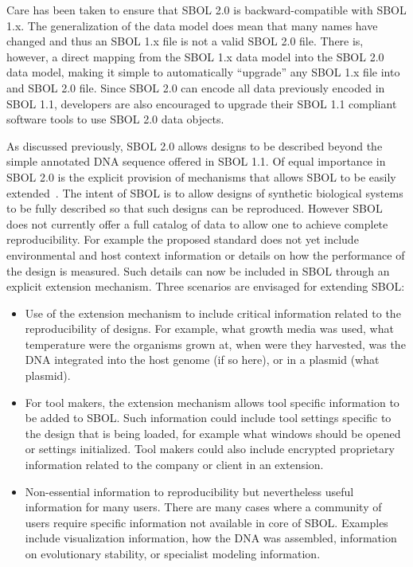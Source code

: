 Care has been taken to ensure that SBOL 2.0 is backward-compatible with SBOL 1.x.  
The generalization of the data model does mean that many names have changed and thus an SBOL 1.x file is not a valid SBOL 2.0 file.
There is, however, a direct mapping from the SBOL 1.x data model into the SBOL 2.0 data model, making it simple to automatically ``upgrade'' any SBOL 1.x file into and SBOL 2.0 file.
Since SBOL 2.0 can encode all data previously encoded in SBOL 1.1, developers are also encouraged to upgrade their SBOL 1.1 compliant software tools to use SBOL 2.0 data objects. 

As discussed previously, SBOL 2.0 allows designs to be described beyond the simple annotated DNA sequence offered in SBOL 1.1. Of equal importance in SBOL 2.0 is the explicit provision of mechanisms that allows SBOL to be easily extended~\cite{sec:Annotation}. The intent of SBOL is to allow designs of synthetic biological systems to be fully described so that such designs can be reproduced. However SBOL does not currently offer a full catalog of data %
to allow one to achieve complete reproducibility. For example the proposed standard does not yet include environmental and host context information or details on how the performance of the design is measured. Such details can now be included in SBOL through an explicit extension mechanism. Three scenarios are envisaged for extending SBOL:

\begin{itemize}
\item Use of the extension mechanism to include critical information related to the reproducibility of designs. For example, what growth media was used, what temperature were the organisms grown at, when were they harvested, was the DNA integrated into the host genome (if so here), or in a plasmid (what plasmid).
\item For tool makers, the extension mechanism allows tool specific information to be added to SBOL. Such information could include tool settings specific to the design that is being loaded, for example what windows should be opened or settings initialized. Tool makers could also include encrypted proprietary information related to the company or client in an extension. 
\item Non-essential information to reproducibility but nevertheless useful information for many users. There are many cases where a community of users require specific information not available in core of SBOL. Examples include visualization information, how the DNA was assembled, information on evolutionary stability, or specialist modeling information.
\end{itemize}

